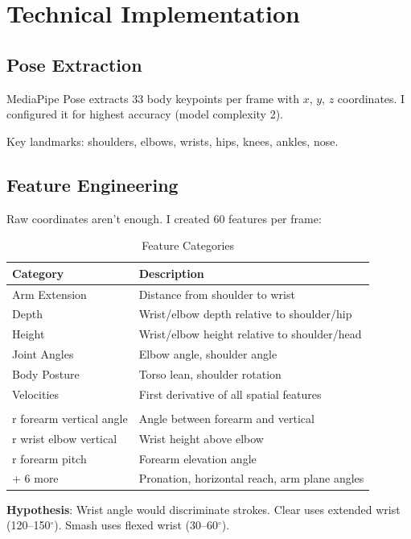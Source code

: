 \documentclass[11pt,a4paper]{article}
\begin{document}
\section{Technical Implementation}

\subsection{Pose Extraction}

MediaPipe Pose extracts 33 body keypoints per frame with $x$, $y$, $z$ coordinates. I configured it for highest accuracy (model complexity 2).

Key landmarks: shoulders, elbows, wrists, hips, knees, ankles, nose.

\subsection{Feature Engineering}

Raw coordinates aren't enough. I created 60 features per frame:

\begin{table}[H]
\centering
\caption{Feature Categories}
\begin{tabular}{ll}
\toprule
Category & Description \\
\midrule
Arm Extension & Distance from shoulder to wrist \\
Depth & Wrist/elbow depth relative to shoulder/hip \\
Height & Wrist/elbow height relative to shoulder/head \\
Joint Angles & Elbow angle, shoulder angle \\
Body Posture & Torso lean, shoulder rotation \\
Velocities & First derivative of all spatial features \\
\addlinespace
\multicolumn{2}{l}{\textbf{Wrist/Forearm Features (9 features):}} \\
\quad r forearm vertical angle & Angle between forearm and vertical \\
\quad r wrist elbow vertical & Wrist height above elbow \\
\quad r forearm pitch & Forearm elevation angle \\
\quad + 6 more & Pronation, horizontal reach, arm plane angles \\
\bottomrule
\end{tabular}
\end{table}

\textbf{Hypothesis}: Wrist angle would discriminate strokes. Clear uses extended wrist (120--150$^\circ$). Smash uses flexed wrist (30--60$^\circ$).
\end{document}
